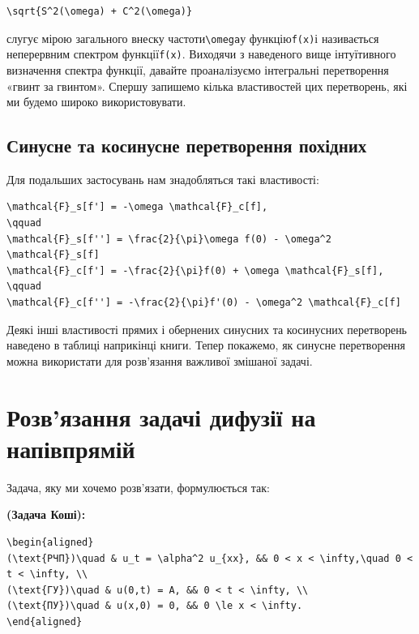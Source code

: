 \documentclass[
  ukrainian,
]{article}
\begin{document}
\begin{verbatim}
\sqrt{S^2(\omega) + C^2(\omega)}
\end{verbatim}

слугує мірою загального внеску частоти\texttt{\textbackslash{}omega}у
функцію\texttt{f(x)}і називається неперервним спектром
функції\texttt{f(x)}. Виходячи з наведеного вище інтуїтивного визначення
спектра функції, давайте проаналізуємо інтегральні перетворення «гвинт
за гвинтом». Спершу запишемо кілька властивостей цих перетворень, які ми
будемо широко використовувати.

\subsection{Синусне та косинусне перетворення
похідних}\label{ux441ux438ux43dux443ux441ux43dux435-ux442ux430-ux43aux43eux441ux438ux43dux443ux441ux43dux435-ux43fux435ux440ux435ux442ux432ux43eux440ux435ux43dux43dux44f-ux43fux43eux445ux456ux434ux43dux438ux445}

Для подальших застосувань нам знадобляться такі властивості:

\begin{verbatim}
\mathcal{F}_s[f'] = -\omega \mathcal{F}_c[f],
\qquad
\mathcal{F}_s[f''] = \frac{2}{\pi}\omega f(0) - \omega^2 \mathcal{F}_s[f]
\mathcal{F}_c[f'] = -\frac{2}{\pi}f(0) + \omega \mathcal{F}_s[f],
\qquad
\mathcal{F}_c[f''] = -\frac{2}{\pi}f'(0) - \omega^2 \mathcal{F}_c[f]
\end{verbatim}

Деякі інші властивості прямих і обернених синусних та косинусних
перетворень наведено в таблиці наприкінці книги. Тепер покажемо, як
синусне перетворення можна використати для розв'язання важливої змішаної
задачі.

\section{Розв'язання задачі дифузії на
напівпрямій}\label{ux440ux43eux437ux432ux44fux437ux430ux43dux43dux44f-ux437ux430ux434ux430ux447ux456-ux434ux438ux444ux443ux437ux456ux457-ux43dux430-ux43dux430ux43fux456ux432ux43fux440ux44fux43cux456ux439}

Задача, яку ми хочемо розв'язати, формулюється так:

\textbf{(Задача Коші):}

\begin{verbatim}
\begin{aligned}
(\text{РЧП})\quad & u_t = \alpha^2 u_{xx}, && 0 < x < \infty,\quad 0 < t < \infty, \\
(\text{ГУ})\quad & u(0,t) = A, && 0 < t < \infty, \\
(\text{ПУ})\quad & u(x,0) = 0, && 0 \le x < \infty.
\end{aligned}
\end{verbatim}
\end{document}
